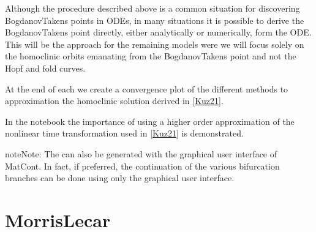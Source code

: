 \documentclass[letterpaper,10pt,english]{jupyterBook}
\begin{document}
\sphinxAtStartPar
Although the procedure described above is a common situation for discovering
Bogdanov\sphinxhyphen{}Takens points in ODEs, in many situations it is possible to derive the
Bogdanov\sphinxhyphen{}Takens point directly, either analytically or numerically, form the
ODE. This will be the approach for the remaining models were we will focus
solely on the homoclinic orbits emanating from the Bogdanov\sphinxhyphen{}Takens point and
not the Hopf and fold curves.

\sphinxAtStartPar
At the end of each  we create a convergence plot of the
different methods to approximation the homoclinic solution derived in
{[}\hyperlink{cite.references:id3}{Kuz21}{]}.

\sphinxAtStartPar
In the notebook {\hyperref[\detokenize{BogdanovTakens::doc}]{}} the importance of
using a higher order approximation of the non\sphinxhyphen{}linear time transformation used
in {[}\hyperlink{cite.references:id3}{Kuz21}{]} is demonstrated.

\begin{sphinxadmonition}{note}{Note:}
\sphinxAtStartPar
The  can also be generated with the graphical user interface of
MatCont. In fact, if preferred, the continuation of the various bifurcation
branches can be done using only the graphical user interface.
\end{sphinxadmonition}


\part{Morris\sphinxhyphen{}Lecar}
\end{document}
